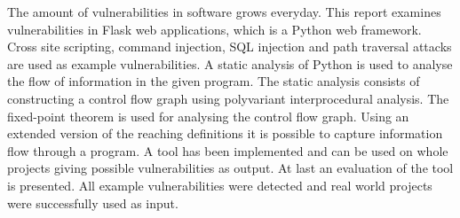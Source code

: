 The amount of vulnerabilities in software grows everyday.
This report examines vulnerabilities in Flask web applications, which is a Python web framework.
Cross site scripting, command injection, SQL injection and path traversal attacks are used as example vulnerabilities.
A static analysis of Python is used to analyse the flow of information in the given program.
The static analysis consists of constructing a control flow graph using polyvariant interprocedural analysis.
The fixed-point theorem is used for analysing the control flow graph.
Using an extended version of the reaching definitions it is possible to capture information flow through a program.
A tool has been implemented and can be used on whole projects giving possible vulnerabilities as output.
At last an evaluation of the tool is presented.
All example vulnerabilities were detected and real world projects were successfully used as input.
